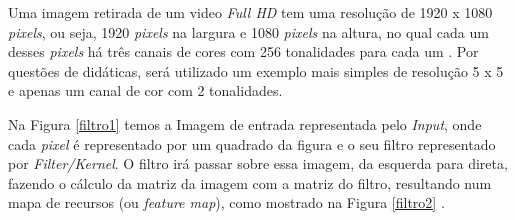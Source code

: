  Uma imagem retirada de um video \textit{Full HD} tem uma resolução de 1920 x 1080 \textit{pixels}, ou seja, 1920 \textit{pixels} na largura e 1080 \textit{pixels} na altura, no qual cada um desses \textit{pixels} há três canais de cores com 256 tonalidades para cada um \cite{resolucao}. Por questões de didáticas, será utilizado um exemplo mais simples de resolução 5 x 5 e apenas um canal de cor com 2 tonalidades.
 \begin{figure}[H]
	\centering
\end{figure}

Na Figura \ref{filtro1} temos a Imagem de entrada representada pelo \textit{Input}, onde cada \textit{pixel} é representado por um quadrado da figura e o seu filtro representado por \textit{Filter/Kernel}. O filtro irá passar sobre essa imagem, da esquerda para direta, fazendo o cálculo da matriz da imagem com a matriz do filtro, resultando num mapa de recursos (ou \textit{feature map}), como mostrado na Figura \ref{filtro2} \cite{conv2}.

 \begin{figure}[H]
	\centering
\end{figure}

